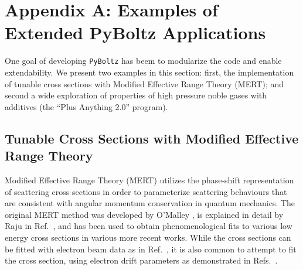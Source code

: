 \documentclass[3p,11pt]{elsarticle}
\begin{document}
\section*{Appendix A: Examples of Extended PyBoltz Applications}

One goal of developing {\tt PyBoltz} has beem to modularize the code and enable extendability.  We present two examples in this section: first, the implementation of tunable cross sections with Modified Effective Range Theory (MERT); and second a wide exploration of properties of high pressure noble gases with additives (the ``Plus Anything 2.0'' program).

\subsection{Tunable Cross Sections with Modified Effective Range Theory}
Modified Effective Range Theory (MERT) utilizes the phase-shift representation of scattering cross sections in order to parameterize scattering behaviours that are consistent with angular momentum conservation in quantum mechanics. The original MERT method was developed by O'Malley \cite{o1963extrapolation}, is explained in detail by Raju in Ref.~\cite{raju2005gaseous}, and has been used to obtain phenomenological fits to various low energy cross sections in various more recent works.  While the cross sections can be fitted with electron beam data as in Ref.~\cite{kurokawa2011high}, it is also common to attempt to fit the cross section, using electron drift parameters as demonstrated in Refs.~\cite{o1963extrapolation, HunterLow1988, pack1992longitudinal}.
\end{document}
